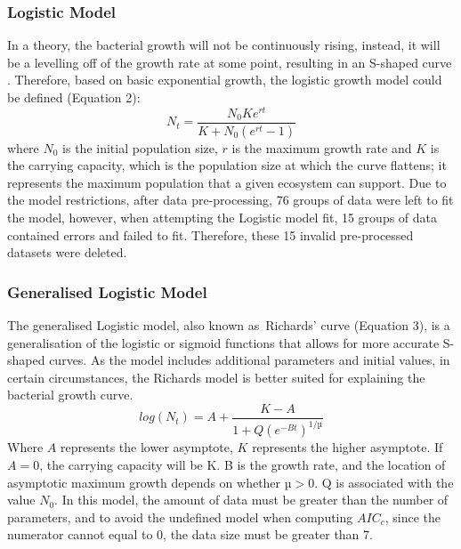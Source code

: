 \documentclass[a4paper]{report}
\begin{document}
\begin{linenumbers}
        \subsubsection{Logistic Model}
        In a theory, the bacterial growth will not be continuously rising, instead, it will be a levelling off of the growth rate at some point, resulting in an S-shaped curve \citep{zwietering1990modeling}. Therefore, based on basic exponential growth, the logistic growth model could be defined (Equation 2): 
        \begin{equation}
                N_t = \frac{N_0 K e^{rt}}{K + N_0 (e^{rt} - 1)}
                \label{eq:logistic}
        \end{equation}
        where $N_0$ is the initial population size, $r$ is the maximum growth rate and $K$ is the carrying capacity, which is the population size at which the curve flattens; it represents the maximum population that a given ecosystem can support. Due to the model restrictions, after data pre-processing, 76 groups of data were left to fit the model, however, when attempting the Logistic model fit, 15 groups of data contained errors and failed to fit. Therefore, these 15 invalid pre-processed datasets were deleted. 
        
        \subsubsection{Generalised Logistic Model}
        The generalised Logistic model, also known as Richards' curve (Equation 3), is a generalisation of the logistic or sigmoid functions that allows for more accurate S-shaped curves. As the model includes additional parameters and initial values, in certain circumstances, the Richards model is better suited for explaining the bacterial growth curve.
        \begin{equation}
                log(N_t) = A + \frac{K - A}{1 + Q (e^{-Bt})^{1/µ}}
                \label{eq:Genlogistic}
        \end{equation}
        Where $A$ represents the lower asymptote, $K$ represents the higher asymptote. If $A = 0$, the carrying capacity will be K. B is the growth rate, and the location of asymptotic maximum growth depends on whether $µ > 0$. Q is associated with the value $N_0$. In this model, the amount of data must be greater than the number of parameters, and to avoid the undefined model when computing $AIC_c$, since the numerator cannot equal to 0, the data size must be greater than 7.


\end{linenumbers}
\end{document}
